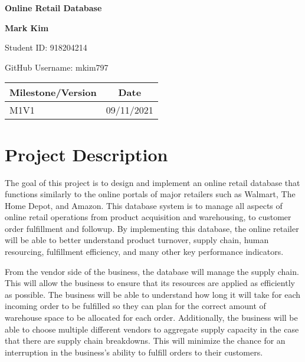 \documentclass{article}
\begin{document}
\begin{titlepage}
\begin{center}
	\vspace*{1cm}
	\Huge
	\textbf{Online Retail Database}
	
	\vspace{1.5cm}
	\LARGE
	\textbf{Mark Kim}
	
	\Large
	Student ID: 918204214
	
	GitHub Username: mkim797
	
	\large
	\vspace{1cm}
	\begin{tabular}{ | l | c | }
		\hline
		\textbf{Milestone/Version} & \textbf{Date}\\
		\hline
		M1V1 & 09/11/2021\\
		\hline
	\end{tabular}

\end{center}
\end{titlepage}

\tableofcontents
\pagebreak

\section{Project Description}
The goal of this project is to design and implement an online retail database that functions similarly to the online portals of major retailers such as Walmart, The Home Depot, and Amazon.  This database system is to manage all aspects of online retail operations from product acquisition and warehousing, to customer order fulfillment and followup.  By implementing this database, the online retailer will be able to better understand product turnover, supply chain, human resourcing, fulfillment efficiency, and many other key performance indicators.

From the vendor side of the business, the database will manage the supply chain.  This will allow the business to ensure that its resources are applied as efficiently as possible.  The business will be able to understand how long it will take for each incoming order to be fulfilled so they can plan for the correct amount of warehouse space to be allocated for each order.  Additionally, the business will be able to choose multiple different vendors to aggregate supply capacity in the case that there are supply chain breakdowns.  This will minimize the chance for an interruption in the business's ability to fulfill orders to their customers.
\end{document}
